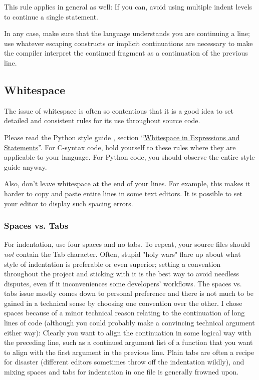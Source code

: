 \documentclass[12pt]{article}
\begin{document}
This rule applies in general as well: If you can, avoid using multiple indent levels to continue a single statement.

In any case, make sure that the language understands you are continuing a line; use whatever escaping constructs or implicit continuations are necessary to make the compiler interpret the continued fragment as a continuation of the previous line.

\subsection{Whitespace}
\label{sec:spacing}
The issue of whitespace is often so contentious that it is a good idea to set detailed and consistent rules for its use throughout source code.

Please read the Python style guide \cite{pyguide}, section ``\href{http://www.python.org/dev/peps/pep-0008/#whitespace-in-expressions-and-statements}{Whitespace in Expressions and Statements}''. For C-syntax code, hold yourself to these rules where they are applicable to your language. For Python code, you should observe the entire style guide anyway.

Also, don't leave whitespace at the end of your lines. For example, this makes it harder to copy and paste entire lines in some text editors. It is possible to set your editor to display such spacing errors.

\subsubsection{Spaces vs. Tabs}
For indentation, use four spaces and no tabs. To repeat, your source files should \emph{not} contain the Tab character. Often, stupid "holy wars" flare up about what style of indentation is preferable or even superior; setting a convention throughout the project and sticking with it is the best way to avoid needless disputes, even if it inconveniences some developers' workflows. The spaces vs. tabs issue mostly comes down to personal preference and there is not much to be gained in a technical sense by choosing one convention over the other. I chose spaces because of a minor technical reason relating to the continuation of long lines of code (although you could probably make a convincing technical argument either way): Clearly you want to align the continuation in some logical way with the preceding line, such as a continued argument list of a function that you want to align with the first argument in the previous line. Plain tabs are often a recipe for disaster (different editors sometimes throw off the indentation wildly), and mixing spaces and tabs for indentation in one file is generally frowned upon.
\end{document}
